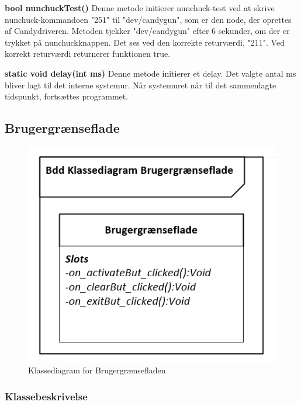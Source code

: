 \textbf{bool nunchuckTest()}	
Denne metode initierer nunchuck-test ved at skrive nunchuck-kommandoen "251" til "dev/candygun", som er den node, der oprettes af Candydriveren. Metoden tjekker "dev/candygun" efter 6 sekunder, om der er trykket på nunchuckknappen. Det ses ved den korrekte returværdi, "211". Ved korrekt returværdi returnerer funktionen true.

\textbf{static void delay(int ms)}
Denne metode initierer et delay. Det valgte antal ms bliver lagt til det interne systemur. Når systemuret når til det sammenlagte tidspunkt, fortsættes programmet.


\subsection{Brugergrænseflade}

\begin{figure}[H]
	\centering
	\includegraphics[width=\textwidth]{DesignOgImplementering/images/KlassediagramGUI}
	\caption{Klassediagram for Brugergrænsefladen}
	\label{fig:KlassediagramGUI}
\end{figure}

\subsubsection{Klassebeskrivelse}
\label{sec:stmDescrip}


